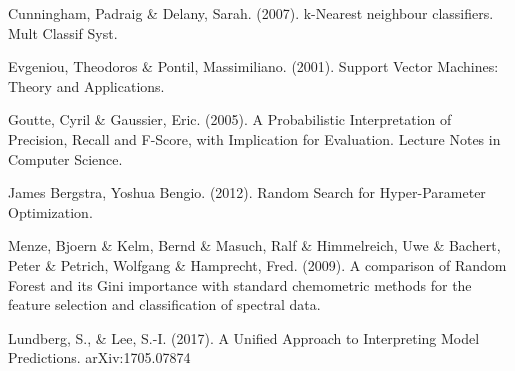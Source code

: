 \documentclass[runningheads]{llncs}
\begin{document}
\begin{thebibliography}{00}
Cunningham, Padraig \& Delany, Sarah. (2007). k-Nearest neighbour classifiers. Mult Classif Syst. 

Evgeniou, Theodoros \& Pontil, Massimiliano. (2001). Support Vector Machines: Theory and Applications.

Goutte, Cyril \& Gaussier, Eric. (2005). A Probabilistic Interpretation of Precision, Recall and F-Score, with Implication for Evaluation. Lecture Notes in Computer Science.

James Bergstra, Yoshua Bengio. (2012). Random Search for Hyper-Parameter Optimization.

Menze, Bjoern \& Kelm, Bernd \& Masuch, Ralf \& Himmelreich, Uwe \& Bachert, Peter \& Petrich, Wolfgang & Hamprecht, Fred. (2009). A comparison of Random Forest and its Gini importance with standard chemometric methods for the feature selection and classification of spectral data.

Lundberg, S., \& Lee, S.-I. (2017). A Unified Approach to Interpreting Model Predictions. arXiv:1705.07874

\end{thebibliography}
\end{document}
